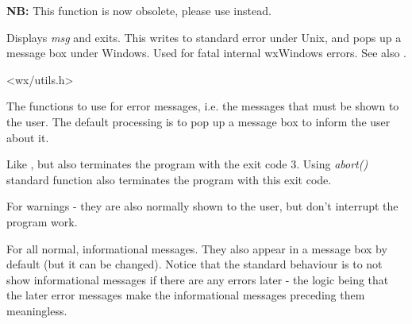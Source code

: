 {\bf NB:} This function is now obsolete, please use 
 instead.

Displays {\it msg} and exits. This writes to standard error under Unix,
and pops up a message box under Windows. Used for fatal internal
wxWindows errors. See also .


<wx/utils.h>

\label{wxlogerror}



The functions to use for error messages, i.e. the messages that must be shown
to the user. The default processing is to pop up a message box to inform the
user about it.

\label{wxlogfatalerror}



Like , but also
terminates the program with the exit code 3. Using {\it abort()} standard
function also terminates the program with this exit code.

\label{wxlogwarning}



For warnings - they are also normally shown to the user, but don't interrupt
the program work.

\label{wxlogmessage}



For all normal, informational messages. They also appear in a message box by
default (but it can be changed). Notice that the standard behaviour is to not
show informational messages if there are any errors later - the logic being
that the later error messages make the informational messages preceding them
meaningless.

